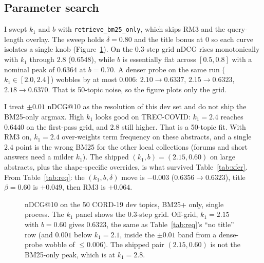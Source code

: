 \documentclass[10pt,a4paper]{article}
\begin{document}
\subsection{Parameter search}
I swept $k_1$ and $b$ with \texttt{retrieve\_bm25\_only}, which skips RM3 and the
query-length overlay. The sweep holds $\delta{=}0.80$ and the title bonus at 0 so
each curve isolates a single knob (Figure~\ref{fig:k1b}). On the $0.3$-step grid nDCG
rises monotonically with $k_1$ through $2.8$ ($0.6548$), while $b$ is essentially
flat across $[0.5,0.8]$ with a nominal peak of $0.6364$ at $b{=}0.70$. A denser
probe on the same run ($k_1\in[2.0,2.4]$) wobbles by at most $0.006$:
$2.10\to0.6337$, $2.15\to0.6323$, $2.18\to0.6370$. That is 50-topic noise, so the
figure plots only the grid.

I treat $\pm0.01$ nDCG@10 as the resolution of this dev set and do not ship the
BM25-only argmax. High $k_1$ looks good on TREC-COVID: $k_1{=}2.4$ reaches
$0.6440$ on the first-pass grid, and $2.8$ still higher. That is a 50-topic fit.
With RM3 on, $k_1{=}2.4$ over-weights term frequency on these abstracts, and a
single $2.4$ point is the wrong BM25 for the other local collections (forums and
short answers need a milder $k_1$). The shipped $(k_1,b)=(2.15,0.60)$ on large
abstracts, plus the shape-specific overrides, is what survived Table~\ref{tab:xfer}.
From Table~\ref{tab:req}: the $(k_1,b,\delta)$ move is $-0.003$ ($0.6356\to 0.6323$),
title $\beta{=}0.60$ is $+0.049$, then RM3 is $+0.064$.

\begin{figure}[!htb]\centering
{}\hfill
{}
\caption{nDCG@10 on the 50 CORD-19 dev topics, BM25+ only, single process. The
$k_1$ panel shows the $0.3$-step grid. Off-grid, $k_1{=}2.15$ with $b{=}0.60$
gives $0.6323$, the same as Table~\ref{tab:req}'s ``no title'' row (and $0.001$
below $k_1{=}2.1$, inside the $\pm0.01$ band from a dense-probe wobble of
$\le 0.006$). The shipped pair $(2.15,0.60)$ is not the BM25-only peak, which is
at $k_1{=}2.8$.}
\label{fig:k1b}
\end{figure}
\end{document}
